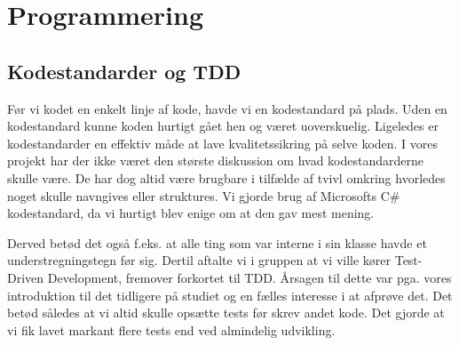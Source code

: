 \section{Programmering}
\subsection{Kodestandarder og TDD}
\label{Kodestandarder og TDD}

Før vi kodet en enkelt linje af kode, havde vi en kodestandard på plads. Uden en kodestandard kunne koden hurtigt gået hen og været uoverskuelig. Ligeledes er kodestandarder en effektiv måde at lave kvalitetssikring på selve koden. I vores projekt har der ikke været den største diskussion om hvad kodestandarderne skulle være. De har dog altid være brugbare i tilfælde af tvivl omkring hvorledes noget skulle navngives eller struktures. Vi gjorde brug af Microsofts C\# kodestandard, da vi hurtigt blev enige om at den gav mest mening.


Derved betød det også f.eks. at alle ting som var interne i sin klasse havde et understregningstegn før sig. Dertil aftalte vi i gruppen at vi ville kører Test-Driven Development, fremover forkortet til TDD. Årsagen til dette var pga. vores introduktion til det tidligere på studiet og en fælles interesse i at afprøve det. Det betød således at vi altid skulle opsætte tests før skrev andet kode. Det gjorde at vi fik lavet markant flere tests end ved almindelig udvikling.